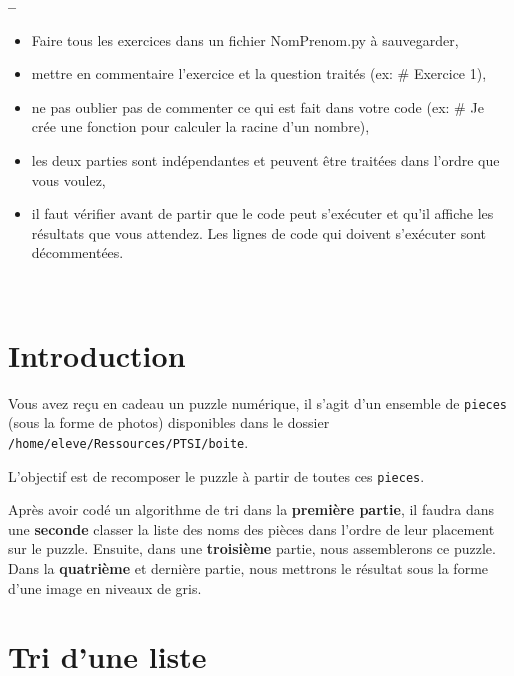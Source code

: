 

\begin{center}
{\Large\bf {\type} \no {\numero} -- \descrip}
\end{center}


\hspace{-1cm}
\begin{boxedminipage}{\textwidth} 
\begin{itemize}
 \item Faire tous les exercices dans un fichier {NomPrenom.py} à sauvegarder,
 \item mettre en commentaire l'exercice et la question traités (ex: \# Exercice 1),
 \item ne pas oublier pas de commenter ce qui est fait dans votre code (ex: \# Je crée une fonction pour calculer la racine d'un nombre),
 \item les deux parties sont indépendantes et peuvent être traitées dans l'ordre que vous voulez,
 \item il faut vérifier avant de partir que le code peut s'exécuter et qu'il affiche les résultats que vous attendez. Les lignes de code qui doivent s'exécuter sont décommentées.
\end{itemize}
\end{boxedminipage}

~\

\section*{Introduction}

Vous avez reçu en cadeau un puzzle numérique, il s'agit d'un ensemble de \verb?pieces? (sous la forme de photos) disponibles dans le dossier \verb?/home/eleve/Ressources/PTSI/boite?.

L'objectif est de recomposer le puzzle à partir de toutes ces \verb?pieces?.

Après avoir codé un algorithme de tri dans la \textbf{première partie}, il faudra dans une \textbf{seconde} classer la liste des noms des pièces dans l'ordre de leur placement sur le puzzle. Ensuite, dans une \textbf{troisième} partie, nous assemblerons ce puzzle. Dans la \textbf{quatrième} et dernière partie, nous mettrons le résultat sous la forme d'une image en niveaux de gris.

\section{Tri d'une liste}


